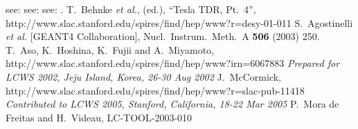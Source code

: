 \begin{thebibliography}{99}
see: 
see: 
see: 
.
  T.~Behnke {\it et al.}, (ed.), ``Tesla TDR, Pt.~4'',
                  {http://www.slac.stanford.edu/spires/find/hep/www?r=desy-01-011}
S.~Agostinelli {\it et al.}  [GEANT4 Collaboration],
Nucl.\ Instrum.\ Meth.\ A {\bf 506} (2003) 250.
T.~Aso, K.~Hoshina, K.~Fujii and A.~Miyamoto,
                  {http://www.slac.stanford.edu/spires/find/hep/www?irn=6067883}
{\it Prepared for LCWS 2002, Jeju Island, Korea, 26-30 Aug 2002}
J.~McCormick,
                  {http://www.slac.stanford.edu/spires/find/hep/www?r=slac-pub-11418}
{\it Contributed to LCWS 2005, Stanford, California, 18-22 Mar 2005}
  P.~Mora de Freitas and H.~Videau, LC-TOOL-2003-010

\end{thebibliography}
